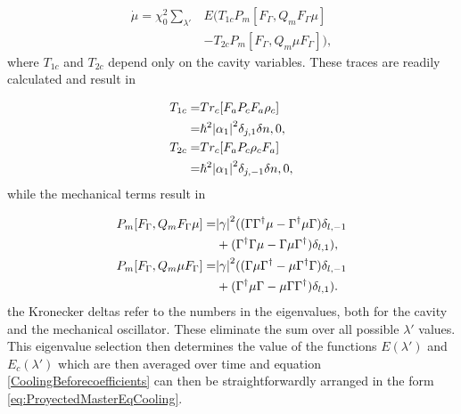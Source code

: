 \documentclass[reprint, amsmath,amssymb, aps,pra]{revtex4-1}
\begin{document}
\begin{align}
\dot{\mu}=\chi_0^2 \sum_{\lambda'}& E(T_{1c}P_m[F_\Gamma,Q_m F_\Gamma \mu]\\
&-T_{2c}P_m[F_\Gamma,Q_m \mu F_\Gamma ]),\nonumber
\end{align} where $T_{1c}$ and $T_{2c}$ depend only on the cavity variables. These traces are readily calculated and result in

\begin{align}
T_{1c}=& Tr_c[F_aP_cF_a\rho_c]\\
=&\hbar^2\abs{\alpha_1}^2 \delta_{j,1}\delta{n,0},\\
T_{2c}=& Tr_c[F_aP_c\rho_cF_a]\\
=&\hbar^2 \abs{\alpha_1}^2 \delta_{j,-1}\delta{n,0},\\
\end{align} while the mechanical terms result in

\begin{align}\label{CoolingBeforecoefficients}
P_m[F_\Gamma,Q_m F_\Gamma \mu] =& \abs{\gamma}^2((\Gamma\Gamma^\dagger \mu - \Gamma^\dagger \mu  \Gamma)\delta_{l,-1} \\
&+ (\Gamma^\dagger\Gamma \mu - \Gamma \mu  \Gamma^\dagger)\delta_{l,1}),\nonumber \\
P_m[F_\Gamma,Q_m  \mu F_\Gamma] =& \abs{\gamma}^2((\Gamma\mu\Gamma^\dagger  - \mu\Gamma^\dagger   \Gamma)\delta_{l,-1}\\ 
&+ (\Gamma^\dagger \mu\Gamma -  \mu \Gamma \Gamma^\dagger)\delta_{l,1}). \nonumber
\end{align} the Kronecker deltas refer to the numbers in the eigenvalues, both for the cavity and the mechanical oscillator. These eliminate the sum over all possible $\lambda'$ values. This eigenvalue selection then determines the value of the functions $E(\lambda')$ and $E_c(\lambda')$ which are then averaged over time and equation \eqref{CoolingBeforecoefficients} can then be straightforwardly arranged in the form \eqref{eq:ProyectedMasterEqCooling}.



\end{document}
